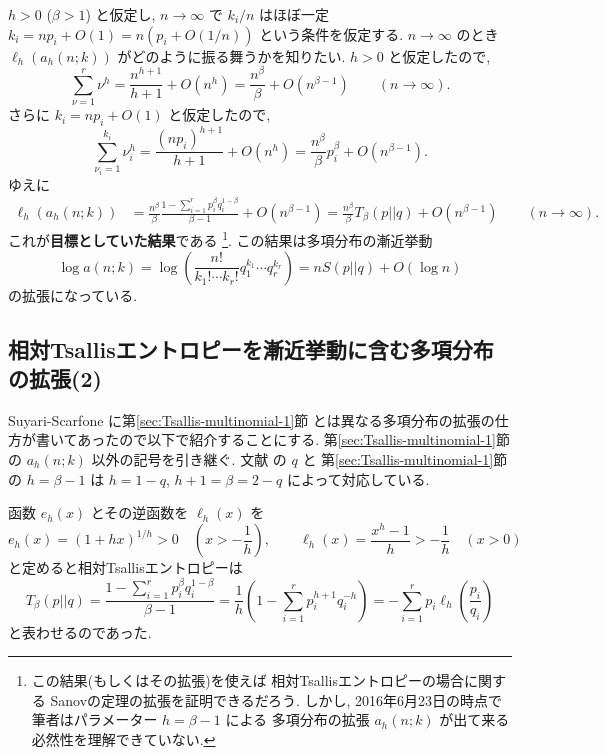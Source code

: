 \documentclass[12pt,twoside]{jarticle}
\theoremstyle{jplain}
\theoremstyle{jplain}
\theoremstyle{jplain}
\numberwithin{theorem}{section}
\numberwithin{equation}{section}
\numberwithin{figure}{section}
\numberwithin{table}{section}
\newcommand\secref[1]{第\ref{#1}節}
\begin{document}
$h>0$ ($\beta>1$) と仮定し,
$n\to\infty$ で $k_i/n$ はほぼ一定 $k_i=n p_i + O(1)=n(p_i+O(1/n))$ という条件を仮定する.
$n\to\infty$ のとき $\ell_h(a_h(n;k))$ がどのように振る舞うかを知りたい.
$h>0$ と仮定したので,
\[
\sum_{\nu=1}^r \nu^h
= \frac{n^{h+1}}{h+1} + O(n^h)
= \frac{n^\beta}{\beta} + O(n^{\beta-1})
\qquad (n\to\infty).
\]
さらに $k_i=np_i+O(1)$ と仮定したので,
\[
\sum_{\nu_i=1}^{k_i}\nu_i^h
= \frac{(np_i)^{h+1}}{h+1} + O(n^h)
= \frac{n^\beta}{\beta}p_i^\beta+ O(n^{\beta-1}).
\]
ゆえに
\begin{align*}
\ell_h(a_h(n;k))
&
=\frac{n^\beta}{\beta}\frac{1-\sum_{i=1}^r p_i^\beta q_i^{1-\beta}}{\beta-1}
+ O(n^{\beta-1})
=\frac{n^\beta}{\beta} T_\beta(p||q) + O(n^{\beta-1})
\qquad(n\to\infty).
\end{align*}
これが{\bfseries 目標としていた結果}である%
\footnote{この結果(もしくはその拡張)を使えば
相対Tsallisエントロピーの場合に関する
Sanovの定理の拡張を証明できるだろう.
しかし, 2016年6月23日の時点で筆者はパラメーター $h=\beta-1$ による
多項分布の拡張 $a_h(n;k)$ が出て来る必然性を理解できていない.}.
この結果は多項分布の漸近挙動
\[
\log a(n;k)
= \log\left( \frac{n!}{k_1!\cdots k_r!}q_1^{k_1}\cdots q_r^{k_r} \right)
= n S(p||q) + O(\log n)
\]
の拡張になっている.



\subsection{相対Tsallisエントロピーを漸近挙動に含む多項分布の拡張(2)}
\label{sec:Tsallis-multinomial-2}

Suyari-Scarfone \cite{Sutari-Scarfone} に\secref{sec:Tsallis-multinomial-1}
とは異なる多項分布の拡張の仕方が書いてあったので以下で紹介することにする.
\secref{sec:Tsallis-multinomial-1}の $a_h(n;k)$ 以外の記号を引き継ぐ.
文献 \cite{Sutari-Scarfone} の $q$ と
\secref{sec:Tsallis-multinomial-1}の $h=\beta-1$ は $h=1-q$, $h+1=\beta=2-q$
によって対応している.

函数 $e_h(x)$ とその逆函数を $\ell_h(x)$ を
\[
e_h(x)=(1+hx)^{1/h}>0 \quad \left(x>-\frac{1}{h}\right), \qquad
\ell_h(x)=\frac{x^h-1}{h}>-\frac{1}{h} \quad (x>0)
\]
と定めると相対Tsallisエントロピーは
\[
T_\beta(p||q)
= \frac{1-\sum_{i=1}^r p_i^\beta q_i^{1-\beta}}{\beta-1}
= \frac{1}{h}\left(1-\sum_{i=1}^r p_i^{h+1}q_i^{-h}\right)
= - \sum_{i=1}^r p_i\ell_h\left(\frac{p_i}{q_i}\right)
\]
と表わせるのであった.
\end{document}
